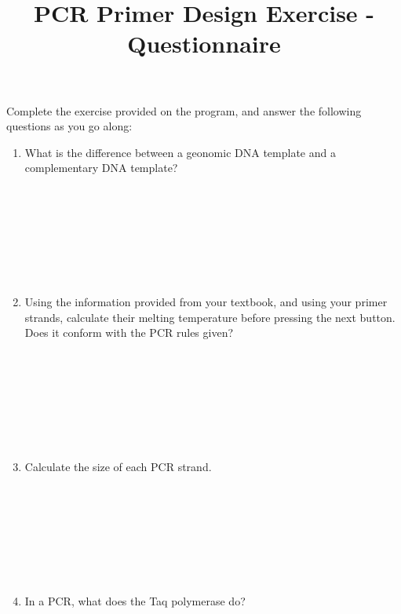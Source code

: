 \documentclass[A4paper]{article}
\title{PCR Primer Design Exercise - Questionnaire}
\begin{document}
\maketitle

Complete the exercise provided on the program, and answer the following questions as you go along:
\begin{enumerate}

\item What is the difference between a geonomic DNA template and a complementary DNA template?
\\ \\
\\ \\
\\ \\
\\ \\

\item Using the information provided from your textbook, and using your primer strands, calculate their melting temperature before pressing the next button. Does it conform with the PCR rules given?
\\ \\
\\ \\
\\ \\
\\ \\

\item Calculate the size of each PCR strand.
\\ \\
\\ \\
\\ \\
\\ \\

\item In a PCR, what does the Taq polymerase do?
\\ \\
\\ \\
\\ \\
\\ \\


\end{enumerate}
\end{document}
